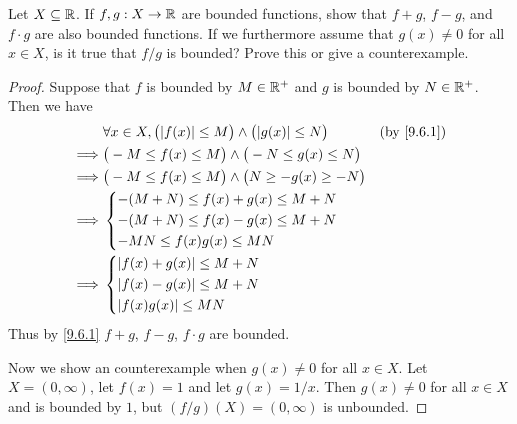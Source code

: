 \begin{ex}\label{ex:9.6.2}
  Let \(X \subseteq \mathbb{R}\).
  If \(f, g: X \to \mathbb{R}\) are bounded functions, show that \(f + g\), \(f - g\), and \(f \cdot g\) are also bounded functions.
  If we furthermore assume that \(g(x) \neq 0\) for all \(x \in X\), is it true that \(f / g\) is bounded?
  Prove this or give a counterexample.
\end{ex}

\begin{proof}
  Suppose that \(f\) is bounded by \(M \in \mathbb{R}^+\) and \(g\) is bounded by \(N \in \mathbb{R}^+\).
  Then we have
  \begin{align*}
             & \forall x \in X, \big(\abs{f(x)} \leq M\big) \land \big(\abs{g(x)} \leq N\big) &  & \by{9.6.1} \\
    \implies & \big(-M \leq f(x) \leq M\big) \land \big(-N \leq g(x) \leq N\big)                              \\
    \implies & \big(-M \leq f(x) \leq M\big) \land \big(N \geq -g(x) \geq -N\big)                             \\
    \implies & \begin{dcases}
                 -(M + N) \leq f(x) + g(x) \leq M + N \\
                 -(M + N) \leq f(x) - g(x) \leq M + N \\
                 -MN \leq f(x) g(x) \leq MN
               \end{dcases}                                                           \\
    \implies & \begin{dcases}
                 \abs{f(x) + g(x)} \leq M + N \\
                 \abs{f(x) - g(x)} \leq M + N \\
                 \abs{f(x) g(x)} \leq MN
               \end{dcases}
  \end{align*}
  Thus by \cref{9.6.1} \(f + g\), \(f - g\), \(f \cdot g\) are bounded.

  Now we show an counterexample when \(g(x) \neq 0\) for all \(x \in X\).
  Let \(X = (0, \infty)\), let \(f(x) = 1\) and let \(g(x) = 1 / x\).
  Then \(g(x) \neq 0\) for all \(x \in X\) and is bounded by \(1\), but \((f / g)(X) = (0, \infty)\) is unbounded.
\end{proof}